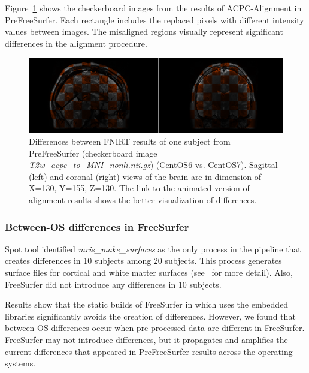 \documentclass[a4paper,num-refs]{oup-contemporary}
\begin{document}
Figure~\ref{fig:fnirt_result} 
shows the checkerboard images from the results of ACPC-Alignment in PreFreeSurfer. 
Each rectangle includes the replaced pixels with different intensity values between images.
The misaligned regions visually represent significant differences in the alignment 
procedure.


\begin{figure}
  \centering
    \includegraphics[width=\columnwidth]{images/t2w_alignment.png} 
    \caption{Differences between FNIRT results of one subject from PreFreeSurfer 
    (checkerboard image \emph{T2w\_acpc\_to\_MNI\_nonli.nii.gz}) (CentOS6 vs. 
    CentOS7). Sagittal (left) and coronal (right) views of the brain are in dimension of X=130, Y=155, Z=130.
    \href{https://github.com/ali4006/HCP-reproducibility-paper/blob/master/images/pfs_t2w_alignment.gif}
    {The link} to the animated version of alignment results shows the better visualization of differences.
} 
    \label{fig:fnirt_result}
\end{figure}


\subsubsection{Between-OS differences in FreeSurfer} 

Spot tool identified \emph{mris\_make\_surfaces} as the only process in 
the pipeline that creates differences in 10 subjects among 20 subjects.
This process generates surface files for cortical and white matter surfaces 
(see~\cite{fischl2012freesurfer} for more detail). 
Also, FreeSurfer did not introduce any differences in 10 subjects. 

Results show that the static builds of FreeSurfer in which uses the embedded libraries 
significantly avoids the creation of differences.
However, we found that between-OS differences occur when pre-processed data are different in FreeSurfer. 
FreeSurfer may not introduce differences, but it propagates and amplifies 
the current differences that appeared in PreFreeSurfer results across the operating systems.
\end{document}
